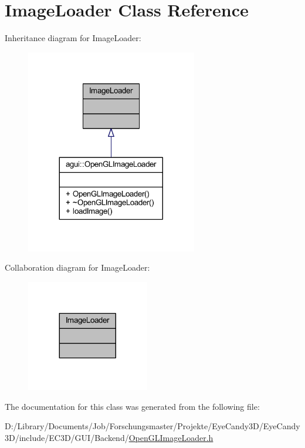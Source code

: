 \hypertarget{class_image_loader}{}\section{Image\+Loader Class Reference}
\label{class_image_loader}


Inheritance diagram for Image\+Loader\+:\nopagebreak
\begin{figure}[H]
\begin{center}
\leavevmode
\includegraphics[width=212pt]{class_image_loader__inherit__graph}
\end{center}
\end{figure}


Collaboration diagram for Image\+Loader\+:\nopagebreak
\begin{figure}[H]
\begin{center}
\leavevmode
\includegraphics[width=152pt]{class_image_loader__coll__graph}
\end{center}
\end{figure}


The documentation for this class was generated from the following file\+:\begin{DoxyCompactItemize}
\item 
D\+:/\+Library/\+Documents/\+Job/\+Forschungsmaster/\+Projekte/\+Eye\+Candy3\+D/\+Eye\+Candy3\+D/include/\+E\+C3\+D/\+G\+U\+I/\+Backend/\mbox{\hyperlink{_open_g_l_image_loader_8h}{Open\+G\+L\+Image\+Loader.\+h}}\end{DoxyCompactItemize}
